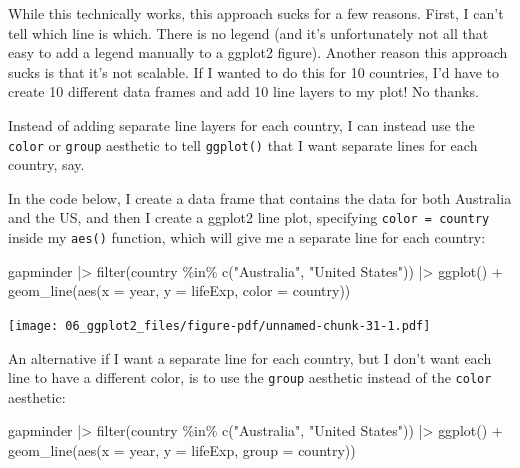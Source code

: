 \documentclass[
  letterpaper,
  DIV=11,
  numbers=noendperiod]{scrreprt}
\newenvironment{Shaded}{\begin{snugshade}}{\end{snugshade}}
\newcommand{\AttributeTok}[1]{\textcolor[rgb]{0.40,0.45,0.13}{#1}}
\newcommand{\FunctionTok}[1]{\textcolor[rgb]{0.28,0.35,0.67}{#1}}
\newcommand{\NormalTok}[1]{\textcolor[rgb]{0.00,0.23,0.31}{#1}}
\newcommand{\SpecialCharTok}[1]{\textcolor[rgb]{0.37,0.37,0.37}{#1}}
\newcommand{\StringTok}[1]{\textcolor[rgb]{0.13,0.47,0.30}{#1}}
\begin{document}
While this technically works, this approach sucks for a few reasons.
First, I can't tell which line is which. There is no legend (and it's
unfortunately not all that easy to add a legend manually to a ggplot2
figure). Another reason this approach sucks is that it's not scalable.
If I wanted to do this for 10 countries, I'd have to create 10 different
data frames and add 10 line layers to my plot! No thanks.

Instead of adding separate line layers for each country, I can instead
use the \texttt{color} or \texttt{group} aesthetic to tell
\texttt{ggplot()} that I want separate lines for each country, say.

In the code below, I create a data frame that contains the data for both
Australia and the US, and then I create a ggplot2 line plot, specifying
\texttt{color\ =\ country} inside my \texttt{aes()} function, which will
give me a separate line for each country:

\begin{Shaded}
\begin{Highlighting}[]
\NormalTok{gapminder }\SpecialCharTok{|\textgreater{}}
  \FunctionTok{filter}\NormalTok{(country }\SpecialCharTok{\%in\%} \FunctionTok{c}\NormalTok{(}\StringTok{"Australia"}\NormalTok{, }\StringTok{"United States"}\NormalTok{)) }\SpecialCharTok{|\textgreater{}}
  \FunctionTok{ggplot}\NormalTok{() }\SpecialCharTok{+}
  \FunctionTok{geom\_line}\NormalTok{(}\FunctionTok{aes}\NormalTok{(}\AttributeTok{x =}\NormalTok{ year, }\AttributeTok{y =}\NormalTok{ lifeExp, }\AttributeTok{color =}\NormalTok{ country))}
\end{Highlighting}
\end{Shaded}

\texttt{[image: 06\_ggplot2\_files/figure-pdf/unnamed-chunk-31-1.pdf]}

An alternative if I want a separate line for each country, but I don't
want each line to have a different color, is to use the \texttt{group}
aesthetic instead of the \texttt{color} aesthetic:

\begin{Shaded}
\begin{Highlighting}[]
\NormalTok{gapminder }\SpecialCharTok{|\textgreater{}}
  \FunctionTok{filter}\NormalTok{(country }\SpecialCharTok{\%in\%} \FunctionTok{c}\NormalTok{(}\StringTok{"Australia"}\NormalTok{, }\StringTok{"United States"}\NormalTok{)) }\SpecialCharTok{|\textgreater{}}
  \FunctionTok{ggplot}\NormalTok{() }\SpecialCharTok{+}
  \FunctionTok{geom\_line}\NormalTok{(}\FunctionTok{aes}\NormalTok{(}\AttributeTok{x =}\NormalTok{ year, }\AttributeTok{y =}\NormalTok{ lifeExp, }\AttributeTok{group =}\NormalTok{ country))}
\end{Highlighting}
\end{Shaded}
\end{document}
